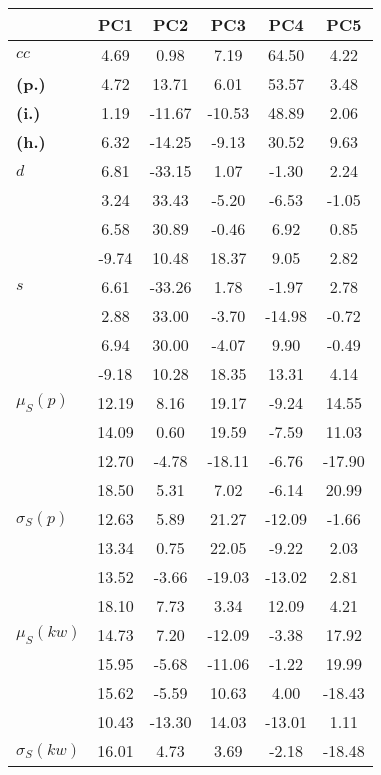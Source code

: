 \begin{table}[h!]
\begin{center}
\begin{tabular}{| l || c | c | c | c | c |}\hline
 & {\bf PC1} & {\bf PC2} & {\bf PC3} & {\bf PC4} & {\bf PC5} \\\hline\hline
{\bf $cc$} & 4.69 & 0.98 & 7.19 & 64.50 & 4.22 \\
{\bf (p.)} & 4.72 & 13.71 & 6.01 & 53.57 & 3.48 \\
{\bf (i.)} & 1.19 & -11.67 & -10.53 & 48.89 & 2.06 \\
{\bf (h.)} & 6.32 & -14.25 & -9.13 & 30.52 & 9.63 \\\hline
{\bf $d$} & 6.81 & -33.15 & 1.07 & -1.30 & 2.24 \\
{\bf } & 3.24 & 33.43 & -5.20 & -6.53 & -1.05 \\
{\bf } & 6.58 & 30.89 & -0.46 & 6.92 & 0.85 \\
{\bf } & -9.74 & 10.48 & 18.37 & 9.05 & 2.82 \\\hline
{\bf $s$} & 6.61 & -33.26 & 1.78 & -1.97 & 2.78 \\
{\bf } & 2.88 & 33.00 & -3.70 & -14.98 & -0.72 \\
 & 6.94  & 30.00  & -4.07  & 9.90  & -0.49 \\
 & -9.18  & 10.28  & 18.35  & 13.31  & 4.14 \\\hline
$\mu_S(p)$ & 12.19  & 8.16  & 19.17  & -9.24  & 14.55 \\
 & 14.09  & 0.60  & 19.59  & -7.59  & 11.03 \\
 & 12.70  & -4.78  & -18.11  & -6.76  & -17.90 \\
 & 18.50  & 5.31  & 7.02  & -6.14  & 20.99 \\\hline
$\sigma_S(p)$ & 12.63  & 5.89  & 21.27  & -12.09  & -1.66 \\
 & 13.34  & 0.75  & 22.05  & -9.22  & 2.03 \\
 & 13.52  & -3.66  & -19.03  & -13.02  & 2.81 \\
 & 18.10  & 7.73  & 3.34  & 12.09  & 4.21 \\\hline
$\mu_S(kw)$ & 14.73  & 7.20  & -12.09  & -3.38  & 17.92 \\
 & 15.95  & -5.68  & -11.06  & -1.22  & 19.99 \\
 & 15.62  & -5.59  & 10.63  & 4.00  & -18.43 \\
 & 10.43  & -13.30  & 14.03  & -13.01  & 1.11 \\\hline
$\sigma_S(kw)$ & 16.01  & 4.73  & 3.69  & -2.18  & -18.48 \\

\end{tabular}
\end{center}
\end{table}
